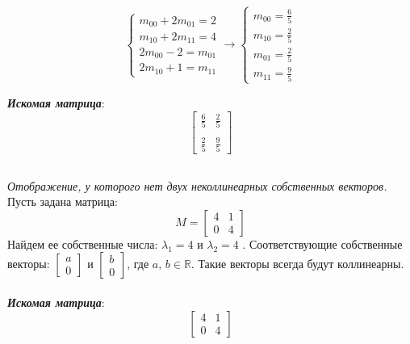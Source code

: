 \documentclass[a5paper, 10pt]{article}
\theoremstyle{definition}
\theoremstyle{plain}
\theoremstyle{remark}
\begin{document}
\begin{equation}
\begin{cases}
m_{0 0} + 2m_{0 1} = 2\\
m_{1 0} + 2m_{1 1} = 4\\
2 m_{0 0} - 2 =  m_{0 1}\\
2m_{1 0} + 1 = m_{1 1} 
\end{cases}
\to
\begin{cases}
m_{0 0} = \frac{6}{5}\\
m_{1 0}  = \frac{2}{5}\\
m_{0 1} = \frac{2}{5} \\
m_{1 1} = \frac{9}{5}
\end{cases}
\end{equation}

\textit{\textbf{Искомая матрица}}:
\begin{equation}
\begin{bmatrix}
 \frac{6}{5} & \frac{2}{5}\\
\\
\frac{2}{5} &  \frac{9}{5}
\end{bmatrix}
\end{equation}

\subsection{}
\textit{Отображение, у которого нет двух неколлинеарных собственных векторов.}\\
Пусть задана матрица:
\begin{equation}
M = 
\begin{bmatrix}
4 & 1\\
0 & 4
\end{bmatrix}
\end{equation}
Найдем ее собственные числа: $\lambda_1 = 4$ и $\lambda_2 = 4$ . Соответствующие собственные векторы: $\begin{bmatrix}
a\\
0 
\end{bmatrix}$ и $\begin{bmatrix}
b\\
0  
\end{bmatrix}$, где $a, \, b \in \mathbb {R}$. Такие векторы всегда будут коллинеарны.\\
\\
\textit{\textbf{Искомая матрица}}:
\begin{equation}
\begin{bmatrix}
4 & 1\\
0 & 4
\end{bmatrix}
\end{equation}
\end{document}

